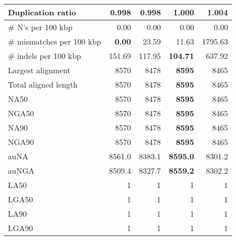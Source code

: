 \documentclass[12pt,a4paper]{article}
\begin{document}
\begin{table}[ht]
\begin{center}
\begin{tabular}{|l*{4}{|r}|}
Duplication ratio & {\bf 0.998} & {\bf 0.998} & 1.000 & 1.004 \\ \hline
\# N's per 100 kbp & 0.00 & 0.00 & 0.00 & 0.00 \\ \hline
\# mismatches per 100 kbp & {\bf 0.00} & 23.59 & 11.63 & 1795.63 \\ \hline
\# indels per 100 kbp & 151.69 & 117.95 & {\bf 104.71} & 637.92 \\ \hline
Largest alignment & 8570 & 8478 & {\bf 8595} & 8465 \\ \hline
Total aligned length & 8570 & 8478 & {\bf 8595} & 8465 \\ \hline
NA50 & 8570 & 8478 & {\bf 8595} & 8465 \\ \hline
NGA50 & 8570 & 8478 & {\bf 8595} & 8465 \\ \hline
NA90 & 8570 & 8478 & {\bf 8595} & 8465 \\ \hline
NGA90 & 8570 & 8478 & {\bf 8595} & 8465 \\ \hline
auNA & 8561.0 & 8383.1 & {\bf 8595.0} & 8301.2 \\ \hline
auNGA & 8509.4 & 8327.7 & {\bf 8559.2} & 8302.2 \\ \hline
LA50 & 1 & 1 & 1 & 1 \\ \hline
LGA50 & 1 & 1 & 1 & 1 \\ \hline
LA90 & 1 & 1 & 1 & 1 \\ \hline
LGA90 & 1 & 1 & 1 & 1 \\ \hline
\end{tabular}
\end{center}
\end{table}
\end{document}
